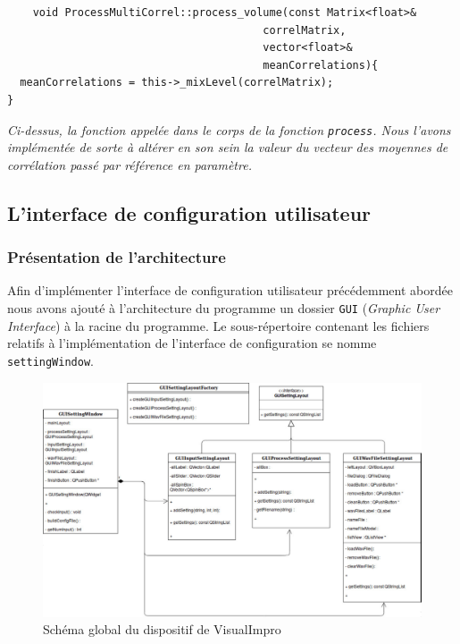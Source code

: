 \begin{lstlisting}
    void ProcessMultiCorrel::process_volume(const Matrix<float>&
                                        correlMatrix,
                                        vector<float>&
                                        meanCorrelations){
  meanCorrelations = this->_mixLevel(correlMatrix);
}
 \end{lstlisting}
 \begin{center}
  \textit{Ci-dessus, la fonction appelée dans le corps de la fonction \verb!process!. Nous l'avons implémentée de sorte à altérer en son sein la valeur du vecteur des moyennes de corrélation passé par référence en paramètre.}
 \end{center}
 
 \subsection{L'interface de configuration utilisateur}
 \paragraph{}
 
 \subsubsection{Présentation de l'architecture}
 Afin d'implémenter l'interface de configuration utilisateur
 précédemment abordée nous avons ajouté à l'architecture du programme
 un dossier \verb!GUI! (\textit{Graphic User Interface}) à la racine
 du programme.  Le sous-répertoire contenant les fichiers relatifs à
 l'implémentation de l'interface de configuration se nomme
 \verb!settingWindow!.
 
 \begin{figure}[h]
  \centering
  \includegraphics[scale=0.3]{assets/umlSettingWindow.png}
  \caption{Schéma global du dispositif de VisualImpro}
  \label{schéma global}
 \end{figure}
 
